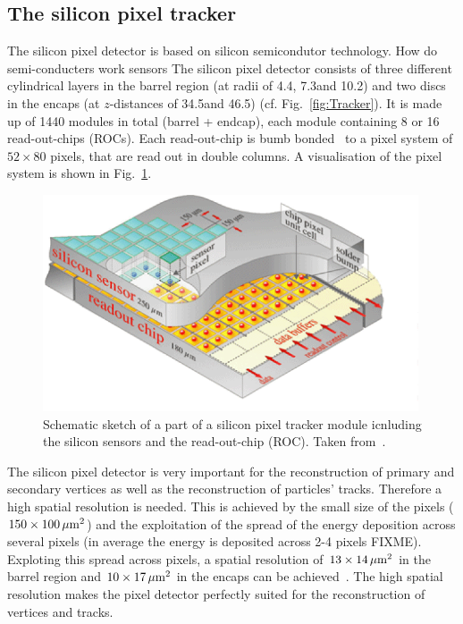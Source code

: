 \subsection*{The silicon pixel tracker}
The silicon pixel detector is based on silicon semicondutor technology.
How do semi-conducters work
sensors 
The silicon pixel detector consists of three different cylindrical layers in the barrel region (at radii of 4.4\cm, 7.3\cm and 10.2\cm) and two discs in the encaps (at $z$-distances of 34.5\cm and 46.5\cm) (cf. Fig.~\ref{fig:Tracker}).
It is made up of 1440 modules in total (barrel + endcap), each module containing 8 or 16 read-out-chips (ROCs).
Each read-out-chip is bumb bonded~\cite{FIXME} to a pixel system of $52\times80$ pixels, that are read out in double columns.
A visualisation of the pixel system is shown in Fig.~\ref{fig:PixelTracker}.
\begin{figure}[!t]
  \centering
      \includegraphics[width=0.99\textwidth]{figures/experiment/CMS/Pixelement.png}
  \caption{Schematic sketch of a part of a silicon pixel tracker module icnluding the silicon sensors and the read-out-chip (ROC). Taken from~\cite{bib:CMS:tracking_8TeV}.}  
  \label{fig:PixelTracker}
\end{figure}

The silicon pixel detector is very important for the reconstruction of primary and secondary vertices as well as the reconstruction of particles' tracks.
Therefore a high spatial resolution is needed.
This is achieved by the small size of the pixels ($ 150 \times 100 \,\mu\text{m}^2$) and the exploitation of the spread of the energy deposition across several pixels (in average the energy is deposited across 2-4 pixels FIXME).
Exploting this spread across pixels, a spatial resolution of $13\times14\,\mu\text{m}^2$ in the barrel region and $10\times17\,\mu\text{m}^2$ in the encaps can be achieved~\cite{FIXME}. 
The high spatial resolution makes the pixel detector perfectly suited for the reconstruction of vertices and tracks.


